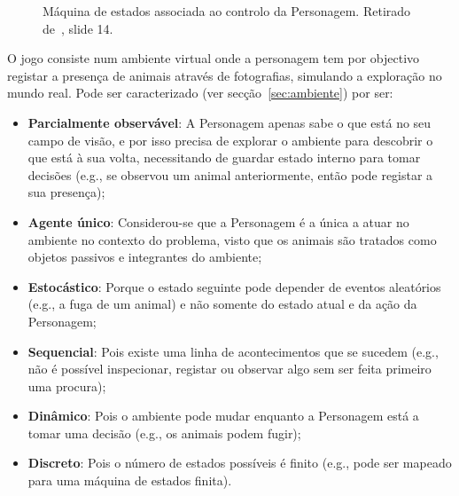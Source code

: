\begin{figure}[H]
    \begin{center}
    \end{center}
    \caption{Máquina de estados associada ao controlo da Personagem.
    Retirado de~\cite{isel:iasa:slides:intro-eng-soft-parte-3}, slide 14.}\label{fig:projeto-parte1-maqest-personagem}
\end{figure}

O jogo consiste num ambiente virtual onde a personagem tem por objectivo registar a presença de animais através de fotografias, simulando a exploração no mundo real.
Pode ser caracterizado (ver secção~\ref{sec:ambiente}) por ser:

\begin{itemize}
    \item \textbf{Parcialmente observável}: A Personagem apenas sabe o que está no seu campo de visão, e por isso precisa de explorar o ambiente para descobrir o que está à sua volta, necessitando de guardar estado interno para tomar decisões (e.g., se observou um animal anteriormente, então pode registar a sua presença);
    \item \textbf{Agente único}: Considerou-se que a Personagem é a única a atuar no ambiente no contexto do problema, visto que os animais são tratados como objetos passivos e integrantes do ambiente;
    \item \textbf{Estocástico}: Porque o estado seguinte pode depender de eventos aleatórios (e.g., a fuga de um animal) e não somente do estado atual e da ação da Personagem;
    \item \textbf{Sequencial}: Pois existe uma linha de acontecimentos que se sucedem (e.g., não é possível inspecionar, registar ou observar algo sem ser feita primeiro uma procura);
    \item \textbf{Dinâmico}: Pois o ambiente pode mudar enquanto a Personagem está a tomar uma decisão (e.g., os animais podem fugir);
    \item \textbf{Discreto}: Pois o número de estados possíveis é finito (e.g., pode ser mapeado para uma máquina de estados finita).
\end{itemize}

